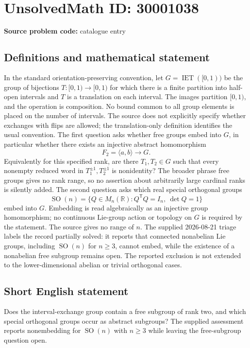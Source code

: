 \documentclass[11pt]{article}
\newcommand{\R}{\mathbb{R}}
\begin{document}
\section*{UnsolvedMath ID: 30001038}
\textbf{Source problem code:} catalogue entry
\subsection{Definitions and mathematical statement}
In the standard orientation-preserving convention, let $G=\operatorname{IET}([0,1))$ be the group of bijections $T:[0,1)\to[0,1)$ for which there is a finite partition into half-open intervals and $T$ is a translation on each interval. The images partition $[0,1)$, and the operation is composition. No bound common to all group elements is placed on the number of intervals. The source does not explicitly specify whether exchanges with flips are allowed; the translation-only definition identifies the usual convention. The first question asks whether free groups embed into $G$, in particular whether there exists an injective abstract homomorphism \[F_2=\langle a,b\rangle\longrightarrow G.\] Equivalently for this specified rank, are there $T_1,T_2\in G$ such that every nonempty reduced word in $T_1^{\pm1},T_2^{\pm1}$ is nonidentity? The broader phrase free groups gives no rank range, so no assertion about arbitrarily large cardinal ranks is silently added. The second question asks which real special orthogonal groups \[\operatorname{SO}(n)=\{Q\in M_n(\R):Q^{\mathsf T}Q=I_n,\ \det Q=1\}\] embed into $G$. Embedding is read algebraically as an injective group homomorphism; no continuous Lie-group action or topology on $G$ is required by the statement. The source gives no range of $n$. The supplied 2026-08-21 triage labels the record partially solved: it reports that connected nonabelian Lie groups, including $\operatorname{SO}(n)$ for $n\geq3$, cannot embed, while the existence of a nonabelian free subgroup remains open. The reported exclusion is not extended to the lower-dimensional abelian or trivial orthogonal cases.
\subsection{Short English statement}
Does the interval-exchange group contain a free subgroup of rank two, and which special orthogonal groups occur as abstract subgroups? The supplied assessment reports nonembedding for $\operatorname{SO}(n)$ with $n\geq3$ while leaving the free-subgroup question open.
\end{document}
